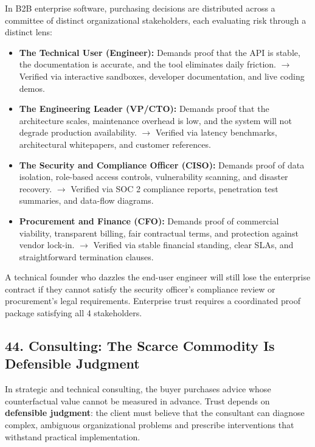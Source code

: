 In B2B enterprise software, purchasing decisions are distributed across a committee of distinct organizational stakeholders, each evaluating risk through a distinct lens:
\begin{itemize}
\item \textbf{The Technical User (Engineer):} Demands proof that the API is stable, the documentation is accurate, and the tool eliminates daily friction. $\rightarrow$ Verified via interactive sandboxes, developer documentation, and live coding demos.
\item \textbf{The Engineering Leader (VP/CTO):} Demands proof that the architecture scales, maintenance overhead is low, and the system will not degrade production availability. $\rightarrow$ Verified via latency benchmarks, architectural whitepapers, and customer references.
\item \textbf{The Security and Compliance Officer (CISO):} Demands proof of data isolation, role-based access controls, vulnerability scanning, and disaster recovery. $\rightarrow$ Verified via SOC 2 compliance reports, penetration test summaries, and data-flow diagrams.
\item \textbf{Procurement and Finance (CFO):} Demands proof of commercial viability, transparent billing, fair contractual terms, and protection against vendor lock-in. $\rightarrow$ Verified via stable financial standing, clear SLAs, and straightforward termination clauses.
\end{itemize}

A technical founder who dazzles the end-user engineer will still lose the enterprise contract if they cannot satisfy the security officer's compliance review or procurement's legal requirements. Enterprise trust requires a coordinated proof package satisfying all 4 stakeholders.

\subsection*{44. Consulting: The Scarce Commodity Is Defensible Judgment}

In strategic and technical consulting, the buyer purchases advice whose counterfactual value cannot be measured in advance. Trust depends on \textbf{defensible judgment}: the client must believe that the consultant can diagnose complex, ambiguous organizational problems and prescribe interventions that withstand practical implementation.

